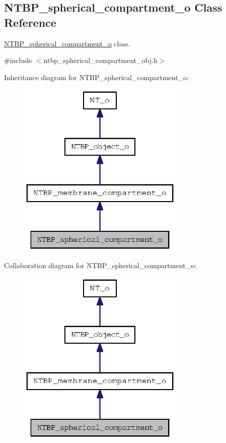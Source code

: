 \subsection{NTBP\_\-spherical\_\-compartment\_\-o Class Reference}
\label{class_n_t_b_p__spherical__compartment__o}


\hyperlink{class_n_t_b_p__spherical__compartment__o}{NTBP\_\-spherical\_\-compartment\_\-o} class.  




{\ttfamily \#include $<$ntbp\_\-spherical\_\-compartment\_\-obj.h$>$}



Inheritance diagram for NTBP\_\-spherical\_\-compartment\_\-o:
\nopagebreak
\begin{figure}[H]
\begin{center}
\leavevmode
\includegraphics[width=226pt]{class_n_t_b_p__spherical__compartment__o__inherit__graph}
\end{center}
\end{figure}


Collaboration diagram for NTBP\_\-spherical\_\-compartment\_\-o:
\nopagebreak
\begin{figure}[H]
\begin{center}
\leavevmode
\includegraphics[width=226pt]{class_n_t_b_p__spherical__compartment__o__coll__graph}
\end{center}
\end{figure}
